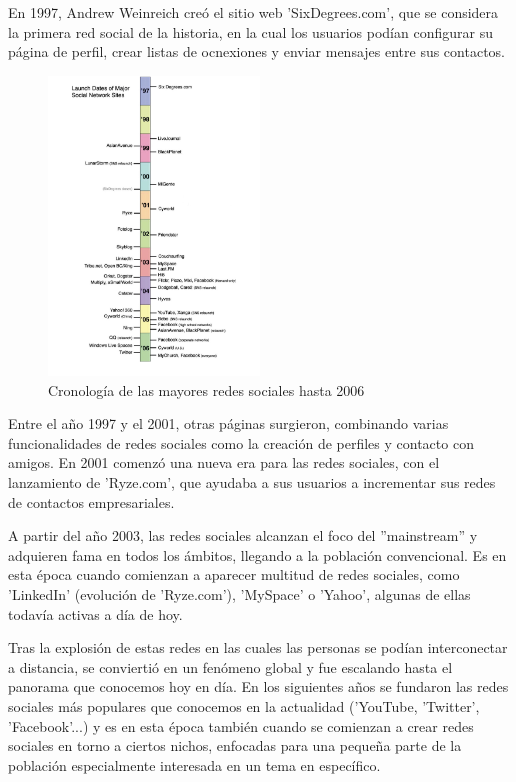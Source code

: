En 1997, Andrew Weinreich creó el sitio web 'SixDegrees.com', que se considera la primera red social de la historia, en la cual los usuarios podían configurar su página de perfil, crear listas de ocnexiones y enviar mensajes entre sus contactos.

\begin{figure}[h]
	\centering
	\includegraphics[width = 0.5\textwidth]{Imagenes/Vectorial/cronologiaRRSS.pdf}
	\caption{Cronología de las mayores redes sociales hasta 2006 \citep{10.1111/j.1083-6101.2007.00393.x}}
	\label{fig:cronologiaRRSS}
\end{figure}

Entre el año 1997 y el 2001, otras páginas surgieron, combinando varias funcionalidades de redes sociales como la creación de perfiles y contacto con amigos. En 2001 comenzó una nueva era para las redes sociales, con el lanzamiento de 'Ryze.com', que ayudaba a sus usuarios a incrementar sus redes de contactos empresariales.

A partir del año 2003, las redes sociales alcanzan el foco del ''mainstream'' y adquieren fama en todos los ámbitos, llegando a la población convencional. Es en esta época cuando comienzan a aparecer multitud de redes sociales, como 'LinkedIn' (evolución de 'Ryze.com'), 'MySpace' o 'Yahoo', algunas de ellas todavía activas a día de hoy.

Tras la explosión de estas redes en las cuales las personas se podían interconectar a distancia, se conviertió en un fenómeno global y fue escalando hasta el panorama que conocemos hoy en día. En los siguientes años se fundaron las redes sociales más populares que conocemos en la actualidad ('YouTube, 'Twitter', 'Facebook'...) y es en esta época también cuando se comienzan a crear redes sociales en torno a ciertos nichos, enfocadas para una pequeña parte de la población especialmente interesada en un tema en específico.

